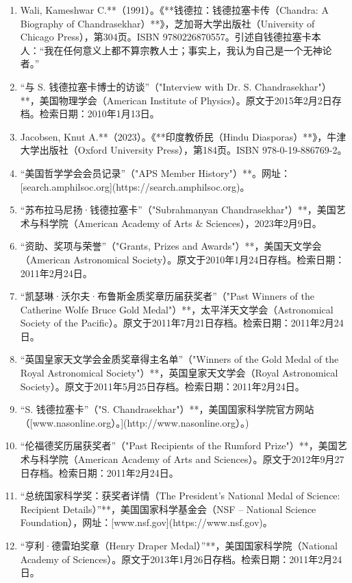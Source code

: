 \begin{enumerate}
\item Wali, Kameshwar C.**（1991）。《**钱德拉：钱德拉塞卡传（Chandra: A Biography of Chandrasekhar）**》，芝加哥大学出版社（University of Chicago Press），第304页。ISBN 9780226870557。引述自钱德拉塞卡本人：“我在任何意义上都不算宗教人士；事实上，我认为自己是一个无神论者。”
\item “与 S. 钱德拉塞卡博士的访谈”（"Interview with Dr. S. Chandrasekhar"）**，美国物理学会（American Institute of Physics）。原文于2015年2月2日存档。检索日期：2010年1月13日。
\item Jacobsen, Knut A.**（2023）。《**印度教侨民（Hindu Diasporas）**》，牛津大学出版社（Oxford University Press），第184页。ISBN 978-0-19-886769-2。
\item “美国哲学学会会员记录”（"APS Member History"）**。网址：[search.amphilsoc.org](https://search.amphilsoc.org)。
\item “苏布拉马尼扬·钱德拉塞卡”（"Subrahmanyan Chandrasekhar"）**，美国艺术与科学院（American Academy of Arts & Sciences），2023年2月9日。
\item “资助、奖项与荣誉”（"Grants, Prizes and Awards"）**，美国天文学会（American Astronomical Society）。原文于2010年1月24日存档。检索日期：2011年2月24日。
\item “凯瑟琳·沃尔夫·布鲁斯金质奖章历届获奖者”（"Past Winners of the Catherine Wolfe Bruce Gold Medal"）**，太平洋天文学会（Astronomical Society of the Pacific）。原文于2011年7月21日存档。检索日期：2011年2月24日。
\item “英国皇家天文学会金质奖章得主名单”（"Winners of the Gold Medal of the Royal Astronomical Society"）**，英国皇家天文学会（Royal Astronomical Society）。原文于2011年5月25日存档。检索日期：2011年2月24日。
\item “S. 钱德拉塞卡”（"S. Chandrasekhar"）**，美国国家科学院官方网站（[www.nasonline.org）。](http://www.nasonline.org）。)
\item “伦福德奖历届获奖者”（"Past Recipients of the Rumford Prize"）**，美国艺术与科学院（American Academy of Arts and Sciences）。原文于2012年9月27日存档。检索日期：2011年2月24日。


\item “总统国家科学奖：获奖者详情（The President's National Medal of Science: Recipient Details）”**，美国国家科学基金会（NSF – National Science Foundation），网址：[www.nsf.gov](https://www.nsf.gov)。

\item “亨利·德雷珀奖章（Henry Draper Medal）”**，美国国家科学院（National Academy of Sciences）。原文于2013年1月26日存档。检索日期：2011年2月24日。


\end{enumerate}
